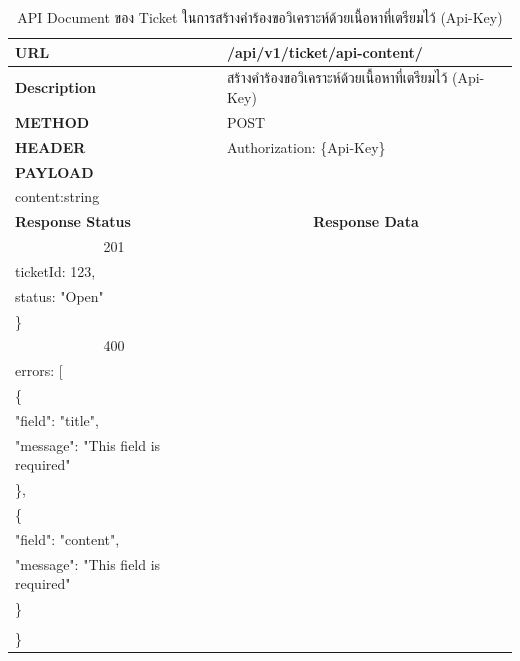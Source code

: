 \documentclass[12pt,oneside,openright,a4paper]{cpe-thai-project}
\begin{document}
\begin{longtable}[!ht]{p{3cm}|p{8cm}}
  \caption{API Document ของ Ticket ในการสร้างคำร้องขอวิเคราะห์ด้วยเนื้อหาที่เตรียมไว้ (Api-Key) }\label{tbl:api_ticket_content_key} 
    \endfirsthead
    \endhead
    \hhline{==} 
    \textbf{URL}              & /api/v1/ticket/api-content/                                                                                            \\ \hline
    \textbf{Description}      & สร้างคำร้องขอวิเคราะห์ด้วยเนื้อหาที่เตรียมไว้ (Api-Key)                                                                                     \\ \hline
    \textbf{METHOD}           & POST                                                                                                                 \\ \hline
    \textbf{HEADER}           & Authorization: \{Api-Key\}                                                                                         \\ \hline
    \textbf{PAYLOAD}          & \begin{tabular}[c]{@{}l@{}}title:\quad\quad string \\ content:\quad string\end{tabular}  \\ \hline \newpage \hline
    \textbf{Response Status}  & \multicolumn{1}{c}{\textbf{Response Data}}                                                                          \\ \hline
    \multicolumn{1}{c|}{201}  & \begin{tabular}[c]{@{}l@{}}\{\\ \quad ticketId: 123,\\ \quad status: "Open"\\ \}\end{tabular}                                 \\ \hline
    \multicolumn{1}{c|}{400}  &
    \begin{tabular}[c]{@{}l@{}}\{\\ \quad errors: {[}\\ \quad\quad\{\\ \quad\quad\quad "field": "title",\\ \quad\quad\quad"message": "This field is required"\\ \quad\quad\},\\ 
      \quad\quad\{\\ \quad\quad\quad"field": "content",\\ \quad\quad\quad "message": "This field is required"\\ \quad\quad \}\\\quad {]}\\ \}\end{tabular}  \\ \hline

\end{longtable}
\end{document}
